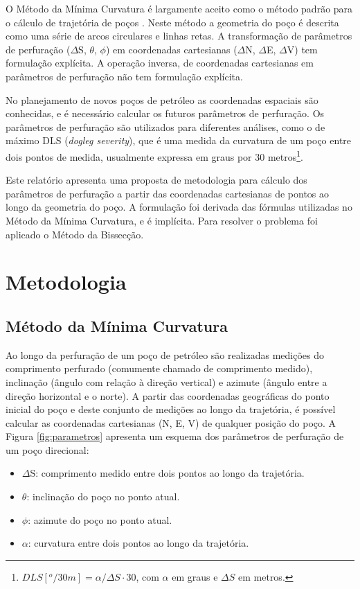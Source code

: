\documentclass[final,5p]{elsarticle}
\numberwithin{equation}{section}
\begin{document}
O Método da Mínima Curvatura é largamente aceito como o método padrão para o cálculo de trajetória de poços \cite{10.2118/84246-MS}. Neste método a geometria do poço é descrita como uma série de arcos circulares e linhas retas. A transformação de parâmetros de perfuração ($\Delta$S, $\theta$, $\phi$) em coordenadas cartesianas ($\Delta$N, $\Delta$E, $\Delta$V) tem formulação explícita. A operação inversa, de coordenadas cartesianas em parâmetros de perfuração não tem formulação explícita.

No planejamento de novos poços de petróleo as coordenadas espaciais são conhecidas, e é necessário calcular os futuros parâmetros de perfuração. Os parâmetros de perfuração são utilizados para diferentes análises, como o de máximo DLS (\emph{dogleg severity}), que é uma medida da curvatura de um poço entre dois pontos de medida, usualmente expressa em graus por 30 metros\footnote{$DLS[^o/30 m] = \alpha / \Delta S \cdot 30$, com $\alpha$ em graus e $\Delta S$ em metros.}.

Este relatório apresenta uma proposta de metodologia para cálculo dos parâmetros de perfuração a partir das coordenadas cartesianas de pontos ao longo da geometria do poço. A formulação foi derivada das fórmulas utilizadas no Método da Mínima Curvatura, e é implícita. Para resolver o problema foi aplicado o Método da Bissecção.

\section{Metodologia}

\subsection{Método da Mínima Curvatura}  \label{subsec:metodominimacurvatura}

Ao longo da perfuração de um poço de petróleo são realizadas medições do comprimento perfurado (comumente chamado de comprimento medido), inclinação (ângulo com relação à direção vertical) e azimute (ângulo entre a direção horizontal e o norte). A partir das coordenadas geográficas do ponto inicial do poço e deste conjunto de medições ao longo da trajetória, é possível calcular as coordenadas cartesianas (N, E, V) de qualquer posição do poço. A Figura \ref{fig:parametros} apresenta um esquema dos parâmetros de perfuração de um poço direcional:

\begin{itemize}
    \item $\Delta$S: comprimento medido entre dois pontos ao longo da trajetória.
    \item $\theta$: inclinação do poço no ponto atual.
    \item $\phi$: azimute do poço no ponto atual.
    \item $\alpha$: curvatura entre dois pontos ao longo da trajetória.
\end{itemize}
\end{document}
